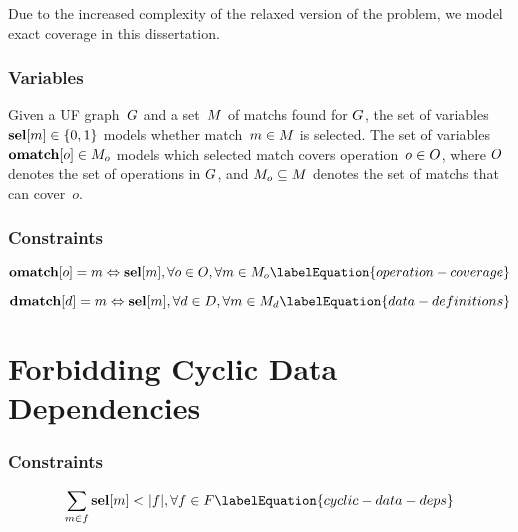 Due to the increased complexity of the relaxed version of the problem, we model
exact coverage in this dissertation.



\subsubsection{Variables}

Given a \gls{UF graph}~$G$ and a set~$\mMatchSet$ of \glspl{match} found
for $G$, the set of \glspl{variable} \mbox{$\mVar{sel}[m] \in \mSet{0,
    1}$} models whether \gls{match}~\mbox{$m \in \mMatchSet$} is selected.
%
The set of \glspl{variable} \mbox{$\mVar{omatch}[o] \in \mMatchSet[o]$} models
which selected match covers operation~\mbox{$o \in O$}, where $O$
denotes the set of operations in $G$, and \mbox{$\mMatchSet[o] \subseteq
  \mMatchSet$} denotes the set of \glspl{match} that can cover~$o$.



\subsubsection{Constraints}




\begin{equation}
  \mVar{omatch}[o] = m \mEq \mVar{sel}[m],
  \forall o \in \mOpSet,
  \forall m \in \mMatchSet[o]
  \labelEquation{operation-coverage}
\end{equation}

\begin{equation}
  \mVar{dmatch}[d] = m \mEq \mVar{sel}[m],
  \forall d \in \mDataSet,
  \forall m \in \mMatchSet[d]
  \labelEquation{data-definitions}
\end{equation}



\section{Forbidding Cyclic Data Dependencies}

\subsubsection{Constraints}

\begin{equation}
  \sum_{m \in f} \mVar{sel}[m] < \mCard{f},
  \forall f \in \mForbiddenCombSet
  \labelEquation{cyclic-data-deps}
\end{equation}
